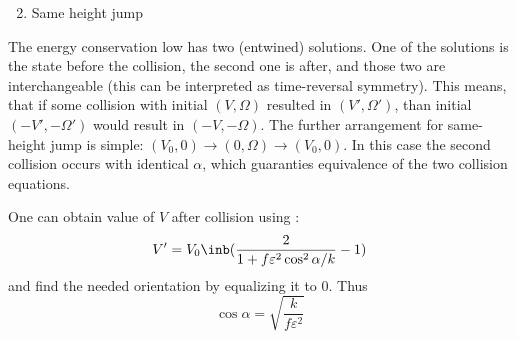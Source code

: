 {\bfseries
\begin{enumerate}
    \setcounter{enumi}{1}
    \item Same height jump
\end{enumerate}
}

The energy conservation low has two (entwined) solutions.
One of the solutions is the state before the collision,
the second one is after, and those two are interchangeable
(this can be interpreted as time-reversal symmetry).
This means, that if some collision with initial $(V, \Omega)$
resulted in $(V', \Omega')$, than
initial $(-V', -\Omega')$ would result in $(-V, -\Omega)$.
The further arrangement for same-height jump is simple:
$(V_0, 0)\rightarrow(0,\Omega)\rightarrow(V_0, 0)$.
In this case the second collision occurs with identical $\alpha$,
which guaranties equivalence of the two collision equations.

One can obtain value of $V$ after collision using :
\begin{equation}
    V'=V_0 \inb({\frac{2}{1+f\varepsilon^2\cos^2\alpha/k}-1})
\end{equation}
and find the needed orientation by equalizing it to $0$. Thus
\begin{equation}
    \cos\alpha =  \sqrt{\frac{k}{f\varepsilon^2}}
\end{equation}


